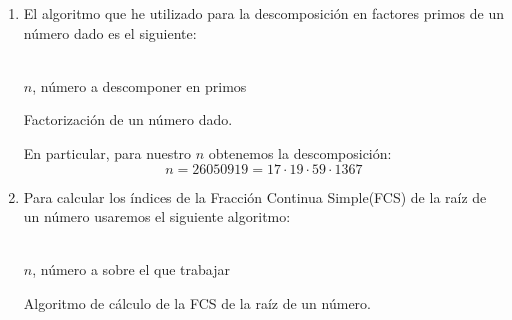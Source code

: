 	\begin{enumerate}
		\item El algoritmo que he utilizado para la descomposición en factores primos de un número dado es el
		siguiente:
		\begin{algorithm}[H]
			\begin{algorithmic}[1]
				\REQUIRE \ \\
					\texttt{$n$}, número a descomponer en primos \
					\ENDWHILE
				\ENDWHILE
				
				\ENDIF
			\end{algorithmic}
			\caption{Factorización de un número dado.}
			\label{Factors}
		\end{algorithm}
		
		En particular, para nuestro $n$ obtenemos la descomposición:
		$$n = 26050919 = 17 \cdot 19 \cdot 59 \cdot 1367$$
		
		\item Para calcular los índices de la Fracción Continua Simple(FCS) de la raíz de un número usaremos el
		siguiente algoritmo:
		\begin{algorithm}[H]
			\begin{algorithmic}[1]
				\REQUIRE \ \\
					\texttt{$n$}, número a sobre el que trabajar \
				\STATE{\texttt{$i = 0$}}
				\STATE{\texttt{$P_i = 0$}}
					\PRINT{\texttt{$P_i, Q_i, q_i$}}
				\ENDWHILE
			\end{algorithmic}
			\caption{Algoritmo de cálculo de la FCS de la raíz de un número.}
			\label{FCS}
		\end{algorithm}
		

\end{enumerate}

